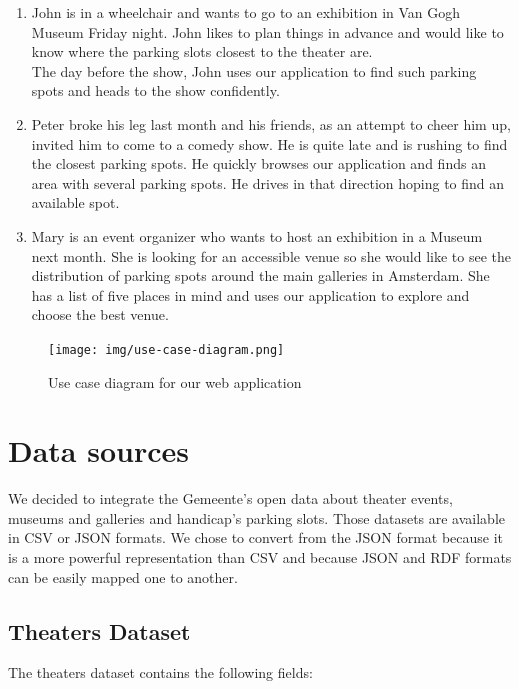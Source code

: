 \documentclass[runningheads,a4paper]{../../StyleFiles/llncs}
\begin{document}
\begin{enumerate}
	\item John is in a wheelchair and wants to go to an exhibition in Van Gogh Museum Friday night. John likes to plan things in advance and would like to know where the parking slots closest to the theater are. \\
	The day before the show, John uses our application to find such parking spots and heads to the show confidently. 
	\item Peter broke his leg last month and his friends, as an attempt to cheer him up, invited him to come to a comedy show. He is quite late and is rushing to find the closest parking spots. He quickly browses our application and finds an area with several parking spots. He drives in that direction hoping to find an available spot. 
	\item Mary is an event organizer who wants to host an exhibition in a Museum next month. She is looking for an accessible venue so she would like to see the distribution of parking spots around the main galleries in Amsterdam. She has a list of five places in mind and uses our application to explore and choose the best venue.
\end{enumerate}

\begin{figure}[h]
	\centering
	\texttt{[image: img/use-case-diagram.png]}
	\caption{Use case diagram for our web application}
	\label{fig:use-case}
\end{figure}

\section{Data sources}
We decided to integrate the Gemeente's open data about theater events, museums and galleries and handicap's parking slots. Those datasets are available in CSV or JSON formats. We chose to convert from the JSON format because it is a more powerful representation than CSV and because JSON and RDF formats can be easily mapped one to another.

\subsection{Theaters Dataset}
The theaters dataset contains the following fields: 
\end{document}
